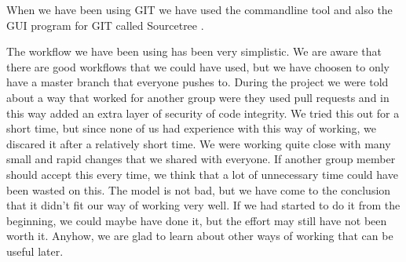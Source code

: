 When we have been using GIT we have used the commandline tool and also the GUI
program for GIT called Sourcetree \cite{SourceTree}.

The workflow we have been using has been very simplistic. We are aware that
there are good workflows that we could have used, but we have choosen to only
have a master branch that everyone pushes to. During the project we were told
about a way that worked for another group were they used pull requests and in
this way added an extra layer of security of code integrity. We tried this out
for a short time, but since none of us had experience with this way of working,
we discared it after a relatively short time. We were working quite close with
many small and rapid changes that we shared with everyone. If another group
member should accept this every time, we think that a lot of unnecessary time
could have been wasted on this. The model is not bad, but we have come to the
conclusion that it didn't fit our way of working very well. If we had started 
to do it from the beginning, we could maybe have done it, but the effort may
still have not been worth it. Anyhow, we are glad to learn about other ways of
working that can be useful later.